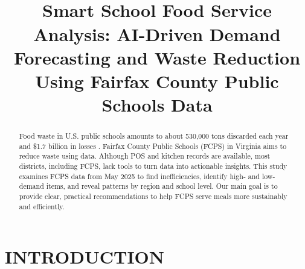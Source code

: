 \documentclass[journal]{IEEEtran}
\begin{document}
\raggedbottom

\title{\ \\ \LARGE\bf Smart School Food Service Analysis: AI-Driven Demand Forecasting and Waste Reduction Using Fairfax County Public Schools Data}

\author{


}

\maketitle

\begin{abstract}
Food waste in U.S. public schools amounts to about 530,000 tons discarded each year and \$1.7 billion in losses \cite{wwl}. Fairfax County Public Schools (FCPS) in Virginia aims to reduce waste using data. Although POS and kitchen records are available, most districts, including FCPS, lack tools to turn data into actionable insights. This study examines FCPS data from May 2025 to find inefficiencies, identify high- and low-demand items, and reveal patterns by region and school level. Our main goal is to provide clear, practical recommendations to help FCPS serve meals more sustainably and efficiently.
\end{abstract}
\section{INTRODUCTION}
\end{document}
